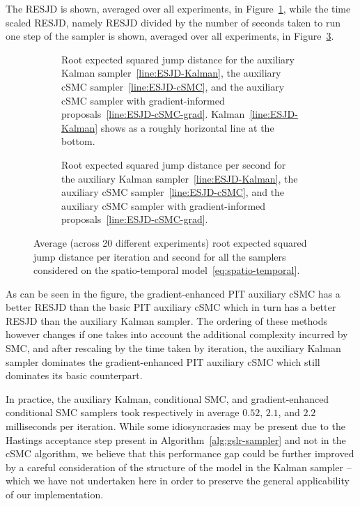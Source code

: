 The RESJD is shown, averaged over all experiments, in Figure~\ref{fig:esjd-spatio-temporal}, while the time scaled RESJD, namely RESJD divided by the number of seconds taken to run one step of the sampler is shown, averaged over all experiments, in Figure~\ref{fig:esjd-spatio-temporal-time}.
\begin{figure}[htb!]
    \centering
    \begin{subfigure}[t]{.45\textwidth}
        \centering
        \resizebox{\columnwidth}{!}{}
        \caption{Root expected squared jump distance for the auxiliary Kalman sampler~\ref{line:ESJD-Kalman}, the auxiliary cSMC sampler~\ref{line:ESJD-cSMC}, and the auxiliary cSMC sampler with gradient-informed proposals~\ref{line:ESJD-cSMC-grad}. Kalman~\ref{line:ESJD-Kalman} shows as a roughly horizontal line at the bottom.}
        \label{fig:esjd-spatio-temporal}
    \end{subfigure}%
    \hfill
    \begin{subfigure}[t]{.45\textwidth}
        \centering
        \resizebox{\columnwidth}{!}{}
        \caption{Root expected squared jump distance per second for the auxiliary Kalman sampler~\ref{line:ESJD-Kalman}, the auxiliary cSMC sampler~\ref{line:ESJD-cSMC}, and the auxiliary cSMC sampler with gradient-informed proposals~\ref{line:ESJD-cSMC-grad}.}
        \label{fig:esjd-spatio-temporal-time}
    \end{subfigure}
    \caption{Average (across 20 different experiments) root expected squared jump distance per iteration and second for all the samplers considered on the spatio-temporal model~\eqref{eq:spatio-temporal}.}
\end{figure}

As can be seen in the figure, the gradient-enhanced PIT auxiliary cSMC has a better RESJD than the basic PIT auxiliary cSMC which in turn has a better RESJD than the auxiliary Kalman sampler. The ordering of these methods however changes if one takes into account the additional complexity incurred by SMC, and after rescaling by the time taken by iteration, the auxiliary Kalman sampler dominates the gradient-enhanced PIT auxiliary cSMC which still dominates its basic counterpart.

In practice, the auxiliary Kalman, conditional SMC, and gradient-enhanced conditional SMC samplers took respectively in average $0.52$, $2.1$, and $2.2$ milliseconds per iteration. While some idiosyncrasies may be present due to the Hastings acceptance step present in Algorithm~\ref{alg:gslr-sampler} and not in the cSMC algorithm, we believe that this performance gap could be further improved by a careful consideration of the structure of the model in the Kalman sampler -- which we have not undertaken here in order to preserve the general applicability of our implementation.


